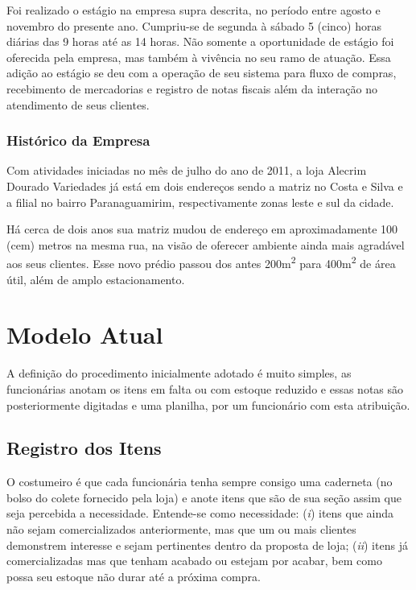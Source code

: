 \documentclass[
	12pt,
	openright,
	oneside, %
	a4paper,
	chapter=TITLE,
	section=TITLE,
	english,
	brazil %
	]{abntex2-udesc}
\begin{document}
Foi realizado o estágio na empresa supra descrita, no período entre agosto e novembro do presente ano. Cumpriu-se de segunda à sábado 5 (cinco) horas diárias das 9 horas até as 14 horas. Não somente a oportunidade de estágio foi oferecida pela empresa, mas também à vivência no seu ramo de atuação. Essa adição ao estágio se deu com a operação de seu sistema para fluxo de compras, recebimento de mercadorias e registro de notas fiscais além da interação no atendimento de seus clientes.

\subsection{Histórico da Empresa}

Com atividades iniciadas no mês de julho do ano de 2011, a loja Alecrim Dourado Variedades já está em dois endereços sendo a matriz no Costa e Silva e a filial no bairro Paranaguamirim, respectivamente zonas leste e sul da cidade.

Há cerca de dois anos sua matriz mudou de endereço em aproximadamente 100 (cem) metros na mesma rua, na visão de oferecer ambiente ainda mais agradável aos seus clientes. Esse novo prédio passou dos antes 200m\textsuperscript{2} para 400m\textsuperscript{2} de área útil, além de amplo estacionamento.

\chapter{Modelo Atual}

A definição do procedimento inicialmente adotado é muito simples, as funcionárias anotam os itens em falta ou com estoque reduzido e essas notas são posteriormente digitadas e uma planilha, por um funcionário com esta atribuição.

\section{Registro dos Itens}

O costumeiro é que cada funcionária tenha sempre consigo uma caderneta (no bolso do colete fornecido pela loja) e anote itens que são de sua seção assim que seja percebida a necessidade. Entende-se como necessidade: (\textit{i}) itens que ainda não sejam comercializados anteriormente, mas que um ou mais clientes demonstrem interesse e sejam pertinentes dentro da proposta de loja; (\textit{ii}) itens já comercializadas mas que tenham acabado ou estejam por acabar, bem como possa seu estoque não durar até a próxima compra.
\end{document}
